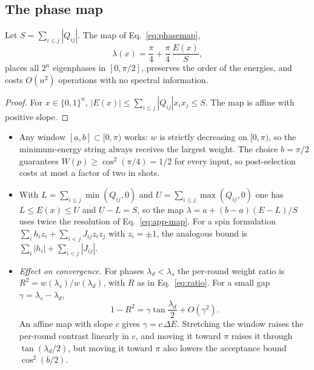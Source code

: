 \subsection{The phase map}
\label{app:phasemap}
\begin{lemma}
\label{lem:window}
Let $S=\sum_{i\le j}|Q_{ij}|$. The map of Eq.~\eqref{eq:phasemap},
\begin{equation}
\lambda(x)=\frac{\pi}{4}+\frac{\pi}{4}\,\frac{E(x)}{S},
\label{eq:app-map}
\end{equation}
places all $2^n$ eigenphases in $[0,\pi/2]$, preserves the order of the energies, and costs $O(n^2)$ operations with no spectral information.
\end{lemma}
\begin{proof}
For $x\in\{0,1\}^n$, $|E(x)|\le\sum_{i\le j}|Q_{ij}|x_ix_j\le S$. The map is affine with positive slope.
\end{proof}

\begin{remark}
\label{rem:window}
\leavevmode
\begin{itemize}
\item[(i)] Any window $[a,b]\subset[0,\pi)$ works: $w$ is strictly decreasing on $[0,\pi)$, so the minimum-energy string always receives the largest weight. The choice $b=\pi/2$ guarantees $W(p)\ge\cos^2(\pi/4)=1/2$ for every input, so post-selection costs at most a factor of two in shots.
\item[(ii)] With $L=\sum_{i\le j}\min(Q_{ij},0)$ and $U=\sum_{i\le j}\max(Q_{ij},0)$ one has $L\le E(x)\le U$ and $U-L=S$, so the map $\lambda=a+(b-a)(E-L)/S$ uses twice the resolution of Eq.~\eqref{eq:app-map}. For a spin formulation $\sum_ih_iz_i+\sum_{i<j}J_{ij}z_iz_j$ with $z_i=\pm1$, the analogous bound is $\sum_i|h_i|+\sum_{i<j}|J_{ij}|$.
\item[(iii)] \emph{Effect on convergence.} For phases $\lambda_d<\lambda_s$ the per-round weight ratio is $R^2=w(\lambda_s)/w(\lambda_d)$, with $R$ as in Eq.~\eqref{eq:ratio}. For a small gap $\gamma=\lambda_s-\lambda_d$,
\begin{equation}
1-R^2=\gamma\tan\frac{\lambda_d}{2}+O(\gamma^2).
\label{eq:app-contrast}
\end{equation}
An affine map with slope $c$ gives $\gamma=c\,\Delta E$. Stretching the window raises the per-round contrast linearly in $c$, and moving it toward $\pi$ raises it through $\tan(\lambda_d/2)$, but moving it toward $\pi$ also lowers the acceptance bound $\cos^2(b/2)$.
\end{itemize}
\end{remark}

